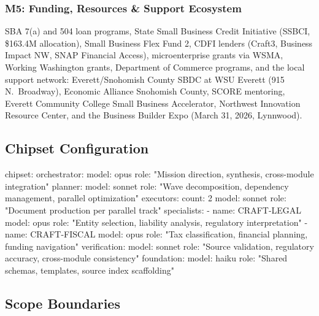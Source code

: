 \documentclass[11pt,letterpaper]{article}
\begin{document}
\subsubsection{M5: Funding, Resources \& Support Ecosystem}
SBA 7(a) and 504 loan programs, State Small Business Credit Initiative (SSBCI, \$163.4M allocation), Small Business Flex Fund 2, CDFI lenders (Craft3, Business Impact NW, SNAP Financial Access), microenterprise grants via WSMA, Working Washington grants, Department of Commerce programs, and the local support network: Everett/Snohomish County SBDC at WSU Everett (915 N.\ Broadway), Economic Alliance Snohomish County, SCORE mentoring, Everett Community College Small Business Accelerator, Northwest Innovation Resource Center, and the Business Builder Expo (March 31, 2026, Lynnwood).

\subsection{Chipset Configuration}

\begin{asciibox}
chipset:
  orchestrator:
    model: opus
    role: "Mission direction, synthesis, cross-module integration"
  planner:
    model: sonnet
    role: "Wave decomposition, dependency management, parallel optimization"
  executors:
    count: 2
    model: sonnet
    role: "Document production per parallel track"
  specialists:
    - name: CRAFT-LEGAL
      model: opus
      role: "Entity selection, liability analysis, regulatory interpretation"
    - name: CRAFT-FISCAL
      model: opus
      role: "Tax classification, financial planning, funding navigation"
  verification:
    model: sonnet
    role: "Source validation, regulatory accuracy, cross-module consistency"
  foundation:
    model: haiku
    role: "Shared schemas, templates, source index scaffolding"
\end{asciibox}

\subsection{Scope Boundaries}
\end{document}
